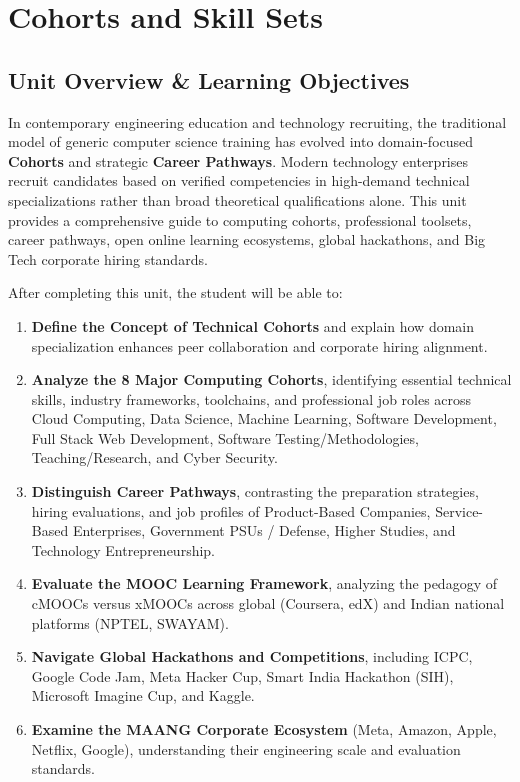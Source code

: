 \chapter{Cohorts and Skill Sets}
\label{chap:cohorts-and-skill-sets}

\section{Unit Overview \& Learning Objectives}

In contemporary engineering education and technology recruiting, the traditional model of generic computer science training has evolved into domain-focused \textbf{Cohorts} and strategic \textbf{Career Pathways}. Modern technology enterprises recruit candidates based on verified competencies in high-demand technical specializations rather than broad theoretical qualifications alone. This unit provides a comprehensive guide to computing cohorts, professional toolsets, career pathways, open online learning ecosystems, global hackathons, and Big Tech corporate hiring standards.

\begin{important}
After completing this unit, the student will be able to:
\begin{enumerate}[leftmargin=1.5em]
    \item \textbf{Define the Concept of Technical Cohorts} and explain how domain specialization enhances peer collaboration and corporate hiring alignment.
    \item \textbf{Analyze the 8 Major Computing Cohorts}, identifying essential technical skills, industry frameworks, toolchains, and professional job roles across Cloud Computing, Data Science, Machine Learning, Software Development, Full Stack Web Development, Software Testing/Methodologies, Teaching/Research, and Cyber Security.
    \item \textbf{Distinguish Career Pathways}, contrasting the preparation strategies, hiring evaluations, and job profiles of Product-Based Companies, Service-Based Enterprises, Government PSUs / Defense, Higher Studies, and Technology Entrepreneurship.
    \item \textbf{Evaluate the MOOC Learning Framework}, analyzing the pedagogy of cMOOCs versus xMOOCs across global (Coursera, edX) and Indian national platforms (NPTEL, SWAYAM).
    \item \textbf{Navigate Global Hackathons and Competitions}, including ICPC, Google Code Jam, Meta Hacker Cup, Smart India Hackathon (SIH), Microsoft Imagine Cup, and Kaggle.
    \item \textbf{Examine the MAANG Corporate Ecosystem} (Meta, Amazon, Apple, Netflix, Google), understanding their engineering scale and evaluation standards.
\end{enumerate}
\end{important}

